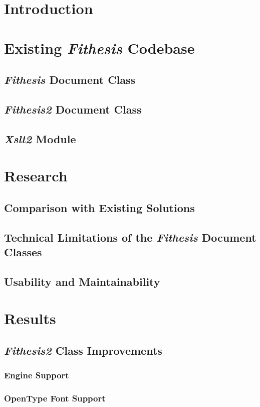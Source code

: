 \documentclass{article}
\begin{document}
  \tableofcontents
  \section{Introduction}
  \section{Existing \emph{Fithesis} Codebase}
  \subsection{\emph{Fithesis} Document Class}
  \subsection{\emph{Fithesis2} Document Class}
  \subsection{\emph{Xslt2} Module}
  \section{Research}
  \subsection{Comparison with Existing Solutions}
  \subsection{Technical Limitations of the \emph{Fithesis} Document Classes}
  \subsection{Usability and Maintainability}
  \section{Results}
  \subsection{\emph{Fithesis2} Class Improvements}
  \subsubsection{\XeLaTeX{} Engine Support}
  \subsubsection{OpenType Font Support}
\end{document}

